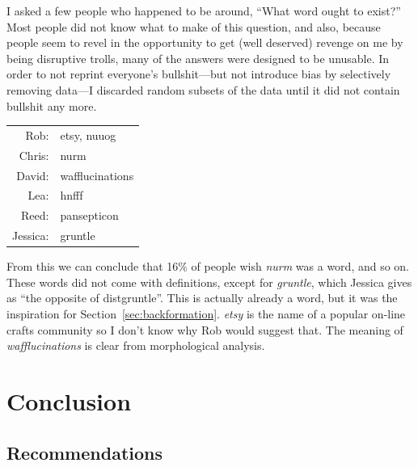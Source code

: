 \documentclass[twocolumn]{article}
\begin{document}
I asked a few people who happened to be around, ``What word ought to
exist?'' Most people did not know what to make of this question, and
also, because people seem to revel in the opportunity to get (well
deserved) revenge on me by being disruptive trolls, many of the
answers were designed to be unusable. In order to not reprint
everyone's bullshit---but not introduce bias by selectively removing
data---I discarded random subsets of the data until it did not contain
bullshit any more.

\begin{center}
\begin{tabular}{rl}
Rob: &  etsy, nuuog \\
Chris: &  nurm \\
David: &  wafflucinations \\
Lea: &  hnfff \\
Reed: &  pansepticon \\
Jessica: &  gruntle \\
\end{tabular}
\end{center}

From this we can conclude that 16\% of people wish {\it nurm} was a word, and so on.
These words did not come with definitions, except for {\it gruntle}, which Jessica
gives as ``the opposite of distgruntle''. This is actually already a word, but
it was the inspiration for Section~\ref{sec:backformation}. {\it etsy} is the name
of a popular on-line crafts community so I don't know why Rob would suggest that.
The meaning of {\it wafflucinations} is clear from morphological analysis.







\section{Conclusion}

\subsection{Recommendations}
\end{document}
